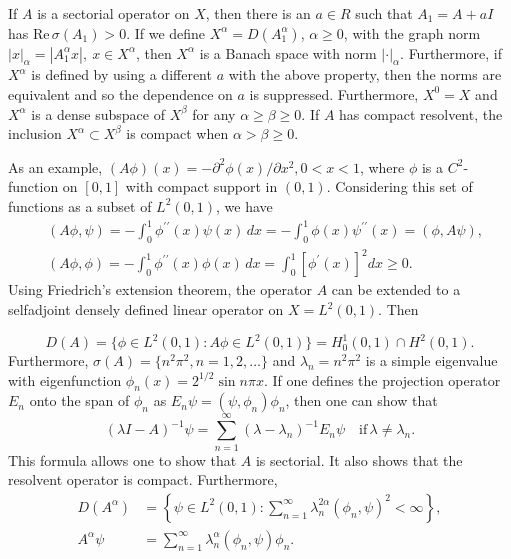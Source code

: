 \documentclass{surv-l}
\theoremstyle{plain}
\theoremstyle{definition}
\numberwithin{equation}{section}
\numberwithin{figure}{chapter}
\begin{document}
If $A$ is a sectorial operator on $X$, then there is an $a\in R$ such that $A_{1}=A+aI$ has $\mathrm{Re}\,\sigma(A_{1})>0$. If we define $X^{\alpha}=D(A_{1}^{\alpha})$, $\alpha\geq 0$, with the graph norm $|x|_{\alpha}=|A_{1}^{\alpha}x|,\ x\in X^{\alpha}$, then $X^{\alpha}$ is a Banach space with norm $|\cdot|_{\alpha}$. Furthermore, if $X^{\alpha}$ is defined by using a different $a$ with the above property, then the norms are equivalent and so the dependence on $a$ is suppressed. Furthermore, $X^{0}=X$ and $X^{\alpha}$ is a dense subspace of $X^{\beta}$ for any $\alpha\geq\beta\geq 0$. If $A$ has compact resolvent, the inclusion $X^{\alpha}\subset X^{\beta}$ is compact when $\alpha>\beta\geq 0$.

As an example, $(A\phi)(x)=-\partial^{2}\phi(x)/\partial x^{2},0<x<1$, where $\phi$ is a
$C^{2}$-function on $[0,1]$ with compact support in $(0,1)$. Considering this set of functions as a subset of $L^{2}(0,1)$, we have
\begin{align*}
&(A\phi, \psi)=-\int_{0}^{1}\phi^{\prime\prime}(x)\psi(x)\,dx=-\int_{0}^{1}\phi(x)\psi^{\prime\prime}(x)=(\phi, A\psi),\\
&(A\phi, \phi)=-\int_{0}^{1}\phi^{\prime\prime}(x)\phi(x)\,dx=\int_{0}^{1}[\phi^{\prime}(x)]^{2}dx\geq 0.
\end{align*}
Using Friedrich's extension theorem, the operator $A$ can be extended to a selfadjoint densely defined linear operator on $X=L^{2}(0,1)$. Then

\begin{equation*}
D(A)=\{\phi\in L^{2}(0, 1)\!:A\phi\in L^{2}(0,1)\}=H_{0}^{1}(0,1)\cap H^{2}(0,1).
\end{equation*}
Furthermore, $\sigma(A)=\{n^{2}\pi^{2}, n=1,2, \ldots \}$ and $\lambda_{n}=n^{2}\pi^{2}$ is a simple eigenvalue with eigenfunction $\phi_{n}(x)=2^{1/2}\sin n\pi x$. If one defines the projection operator $E_{n}$ onto the span of $\phi_{n}$ as $E_{n}\psi=(\psi, \phi_{n})\phi_{n}$, then one can show that
\begin{equation*}
(\lambda I-A)^{-1}\psi=\sum_{n=1}^{\infty}(\lambda-\lambda_{n})^{-1}E_{n}\psi\quad \mathrm{if}\,\lambda\neq\lambda_{n}.
\end{equation*}
This formula allows one to show that $A$ is sectorial. It also shows that the resolvent operator is compact. Furthermore,
\begin{align*}
D(A^{\alpha})&=\left\{\psi\in L^{2}(0,1)\!:\sum_{n=1}^{\infty}\lambda_{n}^{2\alpha}(\phi_{n},\psi)^{2}<\infty\right\},\\
A^{\alpha}\psi&=\sum_{n=1}^{\infty}\lambda_{n}^{\alpha}(\phi_{n}, \psi)\phi_{n}.
\end{align*}
\end{document}
